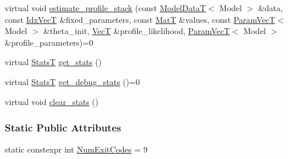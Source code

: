 \begin{DoxyCompactItemize}
\item 
virtual void \hyperlink{classmappel_1_1Estimator_aa86d466843e5dae1e2eaaecb98012ff4}{estimate\+\_\+profile\+\_\+stack} (const \hyperlink{namespacemappel_a97f050df953605381ae9c901c3b125f1}{Model\+DataT}$<$ Model $>$ \&data, const \hyperlink{namespacemappel_ac63743dcd42180127307cd0e4ecdd784}{Idx\+VecT} \&fixed\+\_\+parameters, const \hyperlink{namespacemappel_a7091ab87c528041f7e2027195fad8915}{MatT} \&values, const \hyperlink{namespacemappel_a0f86d3153e4e27b095012f140eea58de}{Param\+VecT}$<$ Model $>$ \&theta\+\_\+init, \hyperlink{namespacemappel_a2225ad69f358daa3f4f99282a35b9a3a}{VecT} \&profile\+\_\+likelihood, \hyperlink{namespacemappel_a0f86d3153e4e27b095012f140eea58de}{Param\+VecT}$<$ Model $>$ \&profile\+\_\+parameters)=0
\item 
virtual \hyperlink{namespacemappel_a04ab395b0cf82c4ce68a36b2212649a5}{StatsT} \hyperlink{classmappel_1_1Estimator_a876af9a1a1a6bf174c63716f3348d735}{get\+\_\+stats} ()
\item 
virtual \hyperlink{namespacemappel_a04ab395b0cf82c4ce68a36b2212649a5}{StatsT} \hyperlink{classmappel_1_1Estimator_a64b26c846a0e995fe16cd56cbead9f99}{get\+\_\+debug\+\_\+stats} ()=0
\item 
virtual void \hyperlink{classmappel_1_1Estimator_a2181f8c34bfc89b5b6b491f4db63a4d8}{clear\+\_\+stats} ()
\end{DoxyCompactItemize}
\subsubsection*{Static Public Attributes}
\begin{DoxyCompactItemize}
\item 
static constexpr int \hyperlink{classmappel_1_1Estimator_afcec036c4d78c12d427e0a733a00a48e}{Num\+Exit\+Codes} = 9
\end{DoxyCompactItemize}
